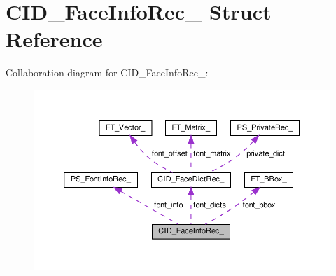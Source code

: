 \hypertarget{structCID__FaceInfoRec__}{}\section{C\+I\+D\+\_\+\+Face\+Info\+Rec\+\_\+ Struct Reference}
\label{structCID__FaceInfoRec__}


Collaboration diagram for C\+I\+D\+\_\+\+Face\+Info\+Rec\+\_\+\+:
\nopagebreak
\begin{figure}[H]
\begin{center}
\leavevmode
\includegraphics[width=350pt]{structCID__FaceInfoRec____coll__graph}
\end{center}
\end{figure}
